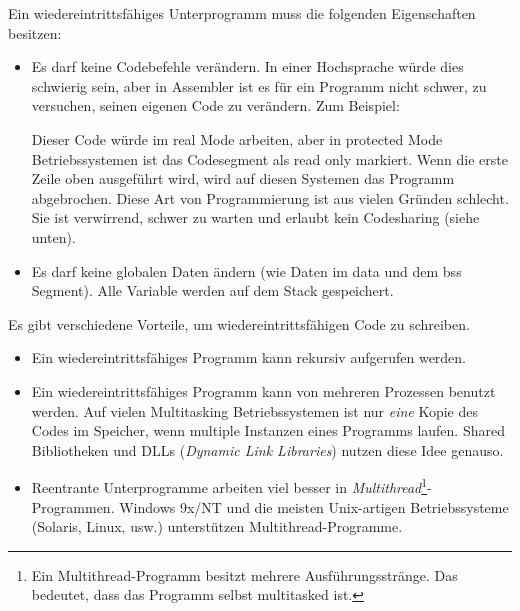  Ein wiedereintrittsf\"{a}higes
Unterprogramm muss die folgenden Eigenschaften besitzen:
\begin{itemize}
\parskip=-0.15em %

\item
Es darf keine Codebefehle ver\"{a}ndern. In einer Hochsprache w\"{u}rde dies
schwierig sein, aber in Assembler ist es f\"{u}r ein Programm nicht
schwer, zu versuchen, seinen eigenen Code zu ver\"{a}ndern. Zum
Beispiel:
Dieser Code w\"{u}rde im real Mode arbeiten, aber in protected Mode
Betriebssystemen ist das Codesegment als read only markiert. Wenn
die erste Zeile oben ausgef\"{u}hrt wird, wird auf diesen Systemen das
Programm abgebrochen. Diese Art von Programmierung ist aus vielen
Gr\"{u}nden schlecht. Sie ist verwirrend, schwer zu warten und erlaubt
kein Codesharing (siehe unten).

\item
Es darf keine globalen Daten \"{a}ndern (wie Daten im {\code data} und
dem {\code bss} Segment). Alle Variable werden auf dem Stack
gespeichert.

\end{itemize}

Es gibt verschiedene Vorteile, um wiedereintrittsf\"{a}higen Code zu
schreiben.
\begin{itemize}
\parskip=-0.15em %

\item
Ein wiedereintrittsf\"{a}higes Programm kann rekursiv aufgerufen werden.

\item
Ein wiedereintrittsf\"{a}higes Programm kann von mehreren Prozessen
benutzt werden. Auf vielen Multitasking Betriebssystemen ist nur
\emph{eine} Kopie des Codes im Speicher, wenn multiple Instanzen
eines Programms laufen. Shared Bibliotheken und DLLs (\emph{Dynamic
Link Libraries}) nutzen diese Idee genauso.

\item
Reentrante Unterprogramme arbeiten viel besser in
\emph{Multithread}\footnote{Ein Multithread-Programm besitzt mehrere
Ausf\"{u}hrungsstr\"{a}nge. Das bedeutet, dass das Programm selbst
multitasked ist.}-Pro\-gram\-men. Windows 9x/NT und die meisten
Unix-artigen Betriebssysteme (Solaris, Linux, usw.) unterst\"{u}tzen
Multithread-Programme.

\end{itemize}

